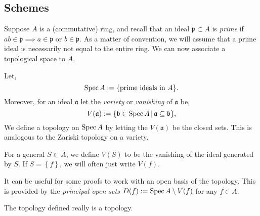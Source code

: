 \documentclass[000-main.tex]{subfiles}
\begin{document}
\subsection{Schemes}%
\label{sec:schemes}

Suppose $A$ is a (commutative) ring, and recall that an ideal $\mathfrak{p}\subset A$ is \emph{prime} if $ab\in\mathfrak{p}\implies a\in \mathfrak{p}$ or $b\in\mathfrak{p}$.
As a matter of convention, we will assume that a prime ideal is necessarily not equal to the entire ring.
We can now associate a topological space to $A$,
\begin{definition}
  Let,
  \[
	\operatorname{Spec} A := \lbrace\text{prime ideals in }A\rbrace.
  \]
  Moreover, for an ideal $\mathfrak{a}$ let the \emph{variety} or \emph{vanishing} of $\mathfrak{a}$ be,
  \[
	V(\mathfrak{a}) := \lbrace\mathfrak{b} \in \operatorname{Spec} A \, | \, \mathfrak{a} \subseteq \mathfrak{b} \rbrace,
  \]
  We define a topology on $\operatorname{Spec} A$ by letting the $V(\mathfrak{a})$ be the closed sets.
  This is analogous to the Zariski topology on a variety.
\end{definition}

\begin{remark}
  For a general $S\subset A$, we define $V(S)$ to be the vanishing of the ideal generated by $S$.
  If $S = \left\{ f \right\}$, we will often just write $V(f)$.

  It can be useful for some proofs to work with an open basis of the topology.
  This is provided by the \emph{principal open sets} $D(f) := \operatorname{Spec} A\setminus V(f)$ for any $f \in A$.
\end{remark}

\begin{lemma}
  The topology defined really is a topology.
\end{lemma} 
\end{document}
